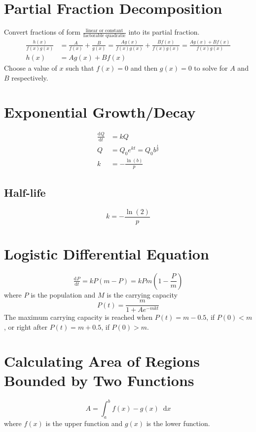 \documentclass[12pt]{article}
\newcommand*{\fixmath}{\makebox{}\vspace{\glueexpr-\baselineskip-\abovedisplayskip}}
\newcommand*{\dd}[3][]{\tfrac{\mathrm{d}^{#1}#2}{\mathrm{d}#3^{#1}}}
\newcommand*{\D}[1]{\mathop{}\!\mathrm{d} #1}
\newenvironment{rmaskip}{\setlength{\abovedisplayskip}{0pt}\fixmath%
  \ignorespaces}{\ignorespacesafterend}
\newenvironment{rmskip}{\setlength{\abovedisplayskip}{0pt}%
  \setlength{\belowdisplayskip}{0pt}\fixmath\ignorespaces}%
  {\ignorespacesafterend}
\begin{document}
\section*{Partial Fraction Decomposition}
Convert fractions of form \(\frac{\text{linear or constant}}{\text{factorable
quadratic}}\) into its partial fraction.
\begin{align*}
  \frac{h(x)}{f(x)g(x)} &= \frac{A}{f(x)} + \frac{B}{g(x)} = \frac{Ag(x)}
  {f(x)g(x)} + \frac{Bf(x)}{f(x)g(x)} = \frac{Ag(x) + Bf(x)}{f(x)g(x)}\\
  h(x) &= Ag(x) + Bf(x)
\end{align*}
Choose a value of \(x\) such that \(f(x) = 0\) and then \(g(x) = 0\) to solve
for \(A\) and \(B\) respectively.
\section*{Exponential Growth\slash Decay}
\begin{rmskip}
  \begin{align*}
    \dd{Q}{t} &= kQ\\
    Q &= Q_0 e^{kt} = Q_0 b^{\frac{t}{p}}\\
    k &= -\frac{\ln(b)}{p}
  \end{align*}
\end{rmskip}
\subsection*{Half-life}
\begin{rmskip}
  \[
    k = -\frac{\ln(2)}{p}
  \]
\end{rmskip}
\section*{Logistic Differential Equation}
\begin{rmaskip}
  \[
    \dd{P}{t} = kP(m - P) = kPm\left(1-\frac{P}{m}\right)
  \]
\end{rmaskip}
where \(P\) is the population and \(M\) is the carrying capacity
\[
  P(t) = \frac{m}{1 + Ae^{-mkt}}
\]
The maximum carrying capacity is reached when \(P(t) = m - 0.5\), if \(P(0) <
m\), or right after \(P(t) = m + 0.5\), if \(P(0) > m\).
\section*{Calculating Area of Regions Bounded by Two Functions}
\begin{rmaskip}
  \[
    A = \int_a^b f(x) - g(x) \D{x}
  \]
\end{rmaskip}
where \(f(x)\) is the upper function and \(g(x)\) is the lower function.
\end{document}
